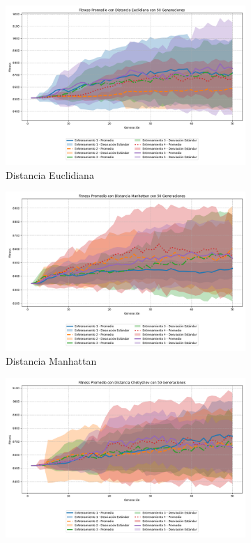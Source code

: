 \documentclass[lettersize, journal]{IEEEtran}
\begin{document}
\begin{figure}[ht]
    \centering
    \begin{subfigure}{0.3\textwidth}
        \centering
        \includegraphics[width=0.9\linewidth]{Euclidiana/Mapa2/Fitness_Prrm_Map2_Eucli_50Gen.png}
        \caption{Distancia Euclidiana}
        \label{fig:ecuclidiana_mapa2}
    \end{subfigure}
    \hfill
    \begin{subfigure}{0.3\textwidth}
        \centering
        \includegraphics[width=0.9\linewidth]{Manhattan/Mapa2/Fitness_Prom_Map2_Manh_50Gen.png}
        \caption{Distancia Manhattan}
        \label{fig:manhattan_mapa2}
    \end{subfigure}
    \hfill
    \begin{subfigure}{0.3\textwidth}
        \centering
        \includegraphics[width=0.9\linewidth]{Chebyshev/Mapa2/Fitness_Prom_Map2_Cheby_50Gen.png}

\end{subfigure}
\end{figure}
\end{document}
